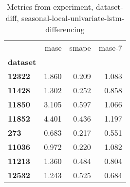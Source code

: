 \begin{table}[h]
\centering
\caption{Metrics from experiment, dataset-diff, seasonal-local-univariate-lstm-differencing}
\label{table:seasonal-local-univariate-lstm-differencing-dataset-diff}
\begin{tabular}{lrrr}
\toprule
{} &   mase &  smape &  mase-7 \\
\textbf{dataset} &        &        &         \\
\midrule
\textbf{12322  } &  1.860 &  0.209 &   1.083 \\
\textbf{11428  } &  1.302 &  0.252 &   0.858 \\
\textbf{11850  } &  3.105 &  0.597 &   1.066 \\
\textbf{11852  } &  4.401 &  0.436 &   1.197 \\
\textbf{273    } &  0.683 &  0.217 &   0.551 \\
\textbf{11036  } &  0.972 &  0.220 &   1.082 \\
\textbf{11213  } &  1.360 &  0.484 &   0.804 \\
\textbf{12532  } &  1.243 &  0.525 &   0.684 \\
\bottomrule
\end{tabular}
\end{table}
